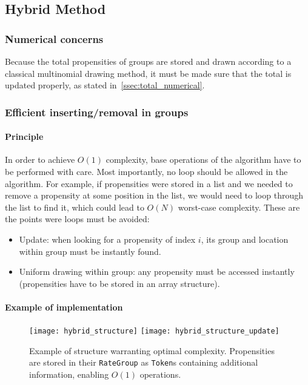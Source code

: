 \subsection{Hybrid Method}

\subsubsection{Numerical concerns}

Because the total propensities of groups are stored and drawn according to a classical multinomial drawing method, it must be made sure that the total is updated properly, as stated in~\ref{ssec:total_numerical}.

\subsubsection{Efficient inserting/removal in groups}

\paragraph{Principle}

In order to achieve $O(1)$ complexity, base operations of the algorithm have to be performed with care. Most importantly, no loop should be allowed in the algorithm. For example, if propensities were stored in a list and we needed to remove a propensity at some position in the list, we would need to loop through the list to find it, which could lead to $O(N)$ worst-case complexity. These are the points were loops must be avoided:
\begin{itemize}
  \item Update: when looking for a propensity of index $i$, its group and location within group must be instantly found.
  \item Uniform drawing within group: any propensity must be accessed instantly (propensities have to be stored in an array structure).
\end{itemize}

\paragraph{Example of implementation}
\begin{figure}[!h]
  \centering
  \texttt{[image: hybrid\_structure]}
  \texttt{[image: hybrid\_structure\_update]}
  \caption{Example of structure warranting optimal complexity. Propensities are stored in their \texttt{RateGroup} as \texttt{Token}s containing additional information, enabling $O(1)$ operations.}
  \label{fig:hybrid_structure}
\end {figure}

